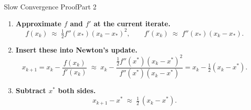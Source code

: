\documentclass[10pt]{beamer}
\begin{document}
\begin{frame}{Slow Convergence Proof}{Part 2}

\begin{enumerate}
\item[3.] \textbf{Approximate \(f\) and \(f'\) at the current iterate.}
      \[
        f(x_k)   \;\approx\; \tfrac12 f''(x_{*})(x_k-x_{*})^{2}, 
        \qquad
        f'(x_k)  \;\approx\; f''(x_{*})(x_k-x_{*}).
      \]

\item[4.] \textbf{Insert these into Newton’s update.}
      \[
      x_{k+1}=x_k-\frac{f(x_k)}{f'(x_k)}
      \;\approx\;
      x_k - \frac{\tfrac12 f''(x^{*})(x_k-x^{*})^{2}}
                  {f''(x^{*})(x_k-x^{*})}
      =
      x_k - \tfrac12(x_k-x^{*}).
      \]

\item[5.] \textbf{Subtract $x^*$ both sides.}
      \[
        x_{k+1}-x^{*} \;\approx\; \tfrac12\,(x_k-x^{*}).
      \]
\end{enumerate}

\end{frame}
\end{document}
